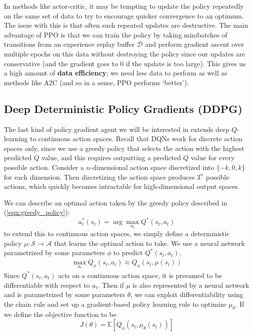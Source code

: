 \documentclass[journal, onecolumn, 12pt, draftclsnofoot]{IEEEtran}
\newcommand{\kword}[1]{\textbf{#1}}
\newcommand{\mc}[1]{\mathcal{#1}}
\begin{document}
		\par In methods like actor-critic, it may be tempting to update the policy repeatedly on the same set of data to try to encourage quicker convergence to an optimum. The issue with this is that often such repeated updates are destructive. The main advantage of PPO is that we can train the policy by taking minibatches of transitions from an experience replay buffer $\mc{D}$ and perform gradient ascent over multiple epochs on this data without destroying the policy since our updates are conservative (and the gradient goes to 0 if the update is too large). This gives us a high amount of \kword{data efficiency}; we need less data to perform as well as methods like A2C (and so in a sense, PPO performs `better').

		\subsection{Deep Deterministic Policy Gradients (DDPG)}
		\par The last kind of policy gradient agent we will be interested in extends deep $Q$-learning to continuous action spaces. Recall that DQNs work for discrete action spaces only, since we use a greedy policy that selects the action with the highest predicted $Q$ value, and this requires outputting a predicted $Q$ value for every possible action. Consider a $n$-dimensional action space discretized into $\{-k,0, k \}$ for each dimension. Then discretizing the action space produces $3^n$ possible actions, which quickly becomes intractable for high-dimensional output spaces.
		\par We can describe an optimal action taken by the greedy policy described in (\ref{eqn:greedy_policy}):
		\begin{equation}
			\label{eqn:optimal-action}
			a_t^*(s_t) = \arg \max_{a_t} Q^*(s_t,a_t)
		\end{equation}
		to extend this to continuous action spaces, we simply define a deterministic policy $\mu: \mc{S} \to \mc{A}$ that learns the optimal action to take. We use a neural network parametrized by some parameters $\phi$ to predict $Q^*(s_t, a_t)$.
		\begin{align}
			\label{eqn:dqn}
			\max_{a_t}Q_\phi(s_t, a_t) \approx Q_\phi(s_t, \mu(s_t))
		\end{align}
		Since $Q^*(s_t,a_t)$ acts on a continuous action space, it is presumed to be differentiable with respect to $a_t$. Then if $\mu$ is also represented by a neural network and is parametrized by some parameters $\theta$, we can exploit differentiability using the chain rule and set up a gradient-based policy learning rule to optimize $\mu_\theta$. If we define the objective function to be
		\begin{equation}
			J(\theta) = \mathbb{E}\left[ Q_\phi(s_t, \mu_\theta(s_t)) \right]
		\end{equation}
\end{document}
